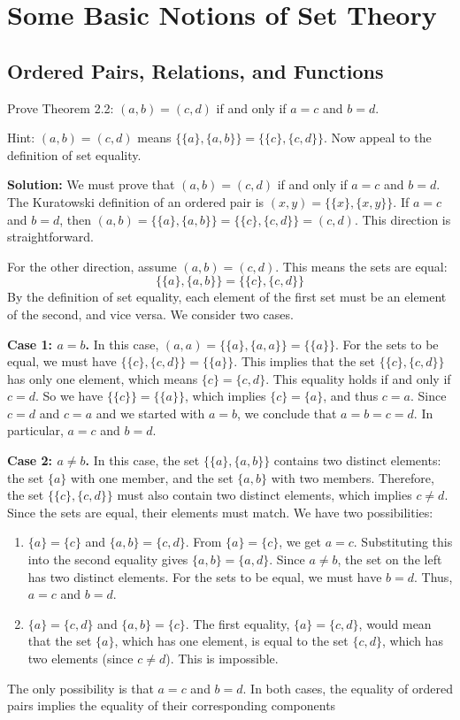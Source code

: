 \chapter{Some Basic Notions of Set Theory}

\section{Ordered Pairs, Relations, and Functions}

\begin{problembox}
Prove Theorem 2.2: $(a, b) = (c, d)$ if and only if $a=c$ and $b=d$.

Hint: $(a, b) = (c, d)$ means $\{\{a\}, \{a, b\}\} = \{\{c\}, \{c, d\}\}$. Now appeal to the definition of set equality.
\end{problembox}

\textbf{Solution:}  
We must prove that $(a, b) = (c, d)$ if and only if $a=c$ and $b=d$.
The Kuratowski definition of an ordered pair is $(x, y) = \{\{x\}, \{x, y\}\}$.
If $a=c$ and $b=d$, then $(a,b) = \{\{a\}, \{a,b\}\} = \{\{c\}, \{c,d\}\} = (c,d)$. This direction is straightforward.

For the other direction, assume $(a, b) = (c, d)$. This means the sets are equal:
\[ \{\{a\}, \{a, b\}\} = \{\{c\}, \{c, d\}\} \]
By the definition of set equality, each element of the first set must be an element of the second, and vice versa. We consider two cases.

\textbf{Case 1: $a=b$.}
In this case, $(a, a) = \{\{a\}, \{a, a\}\} = \{\{a\}\}$.
For the sets to be equal, we must have $\{\{c\}, \{c, d\}\} = \{\{a\}\}$. This implies that the set $\{\{c\}, \{c, d\}\}$ has only one element, which means $\{c\} = \{c, d\}$. This equality holds if and only if $c=d$.
So we have $\{\{c\}\} = \{\{a\}\}$, which implies $\{c\} = \{a\}$, and thus $c=a$.
Since $c=d$ and $c=a$ and we started with $a=b$, we conclude that $a = b = c = d$. In particular, $a=c$ and $b=d$.

\textbf{Case 2: $a \neq b$.}
In this case, the set $\{\{a\}, \{a, b\}\}$ contains two distinct elements: the set $\{a\}$ with one member, and the set $\{a, b\}$ with two members. Therefore, the set $\{\{c\}, \{c, d\}\}$ must also contain two distinct elements, which implies $c \neq d$.
Since the sets are equal, their elements must match. We have two possibilities:
\begin{enumerate}
\item $\{a\} = \{c\}$ and $\{a, b\} = \{c, d\}$.
From $\{a\} = \{c\}$, we get $a=c$. Substituting this into the second equality gives $\{a, b\} = \{a, d\}$. Since $a \neq b$, the set on the left has two distinct elements. For the sets to be equal, we must have $b=d$. Thus, $a=c$ and $b=d$.
\item $\{a\} = \{c, d\}$ and $\{a, b\} = \{c\}$.
The first equality, $\{a\} = \{c, d\}$, would mean that the set $\{a\}$, which has one element, is equal to the set $\{c, d\}$, which has two elements (since $c \neq d$). This is impossible.
\end{enumerate}
The only possibility is that $a=c$ and $b=d$. In both cases, the equality of ordered pairs implies the equality of their corresponding components

